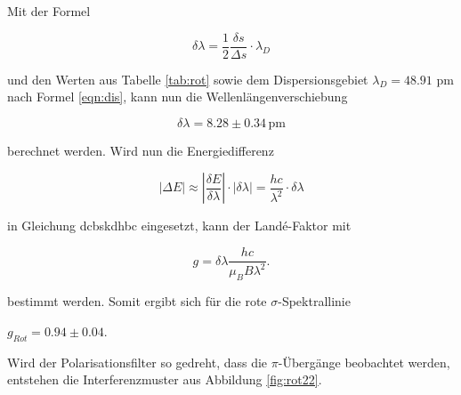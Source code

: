 \newpage
\noindent
Mit der Formel 

\begin{equation}
  \label{eqn:Wellenlaenge}
  \delta \lambda = \frac{1}{2} \frac{\delta s}{\Delta s} \cdot \lambda_D
\end{equation}

\noindent
und den Werten aus Tabelle \ref{tab:rot} sowie dem Dispersionsgebiet $\lambda_D = 48.91$ pm nach Formel \ref{eqn:dis}, kann nun die Wellenlängenverschiebung 

\begin{equation*}
    \delta \lambda = 8.28 \pm 0.34 \, \text{pm}
  \end{equation*}

\noindent
berechnet werden. Wird nun die Energiedifferenz

\begin{equation}
    |\Delta E| \approx \left | \frac{\delta E}{\delta \lambda} \right | \cdot |\delta \lambda | = \frac{h c}{\lambda^2} \cdot \delta \lambda
\end{equation}

\noindent
in Gleichung dcbskdhbc eingesetzt, kann der Landé-Faktor mit 

\begin{equation}
    \label{eqn:g}
    g = \delta \lambda \frac{hc}{\mu_B B \lambda^2}.
\end{equation}

\noindent
bestimmt werden. Somit ergibt sich für die rote $\sigma$-Spektrallinie

\begin{center}
    $g_{Rot} = 0.94 \pm 0.04$.
\end{center}

\noindent
Wird der Polarisationsfilter so gedreht, dass die $\pi$-Übergänge beobachtet werden, entstehen die Interferenzmuster aus Abbildung \ref{fig:rot22}.

